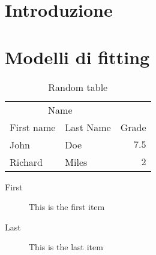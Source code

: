 


\maketitle
\clearpage

\tableofcontents
\clearpage

\section{Introduzione}


\section{Modelli di fitting}




\begin{table}
\caption{Random table}
\centering
	\begin{tabular}{llr}
		\toprule
		\multicolumn{2}{c}{Name} \\
		\cmidrule(r){1-2}
			First name & Last Name & Grade \\
		\midrule
			John & Doe & $7.5$ \\
			Richard & Miles & $2$ \\
		\bottomrule
	\end{tabular}
\end{table}

\begin{description}
	\item[First] This is the first item
	\item[Last] This is the last item
\end{description}


